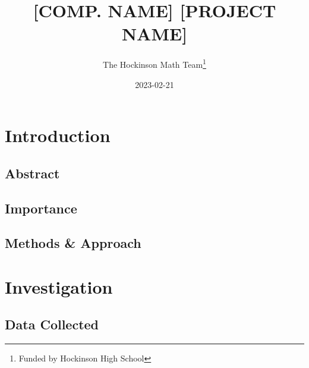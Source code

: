 \documentclass[12pt, letterpaper]{article}
\title{[COMP. NAME] [PROJECT NAME]}
\author{The Hockinson Math Team\thanks{Funded by Hockinson High School}}
\date{2023-02-21}
\begin{document}
\maketitle              %
\tableofcontents        %
\newpage                %

\section{Introduction}

\subsection{Abstract}
\paragraph{\blindtext}

\subsection{Importance}
\paragraph{\blindtext}
\paragraph{\blindtext}

\subsection{Methods \& Approach}
\paragraph{\blindtext}

\section{Investigation}

\subsection{Data Collected}
\end{document}
